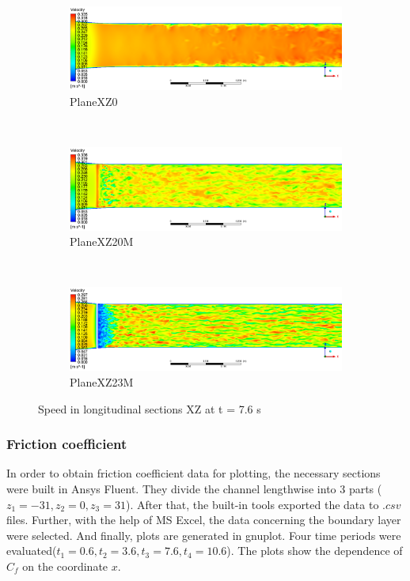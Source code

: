 	\begin{figure}[H]
		\begin{subfigure}{1\textwidth}
			\centering
			\includegraphics[width=1\linewidth]{../Assets/T76_Velocity_ContourXZ0}
			\caption{PlaneXZ0}
			\label{fig:T76VelocityContourXZ0}
		\end{subfigure}%
		\\
		\begin{subfigure}{1\textwidth}
			\centering
			\includegraphics[width=1\linewidth]{../Assets/T76_Velocity_ContourXZ20M}
			\caption{PlaneXZ20M}
			\label{fig:T76VelocityContourXZ20M}
		\end{subfigure}%
		\\
		\begin{subfigure}{1\textwidth}
			\centering
			\includegraphics[width=1\linewidth]{../Assets/T76_Velocity_ContourXZ23M}
			\caption{PlaneXZ23M}
			\label{fig:T76VelocityContourXZ23M}
		\end{subfigure}
		\caption{Speed in longitudinal sections XZ at t = 7.6 s}
		\label{fig:T76VelocityContourXZ}
	\end{figure}
	\newpage
\subsubsection{Friction coefficient}
	In order to obtain friction coefficient data for plotting, the necessary sections were built in Ansys Fluent. They divide the channel lengthwise into 3 parts ($z_1 = -31, z_2 = 0, z_3 = 31$). After that, the built-in tools exported the data to $.csv$ files. Further, with the help of MS Excel, the data concerning the boundary layer were selected. And finally, plots are generated in gnuplot. Four time periods were evaluated($t_1 = 0.6, t_2 = 3.6, t_3 = 7.6, t_4 = 10.6$). The plots show the dependence of $C_f$ on the coordinate $x$. 
	
